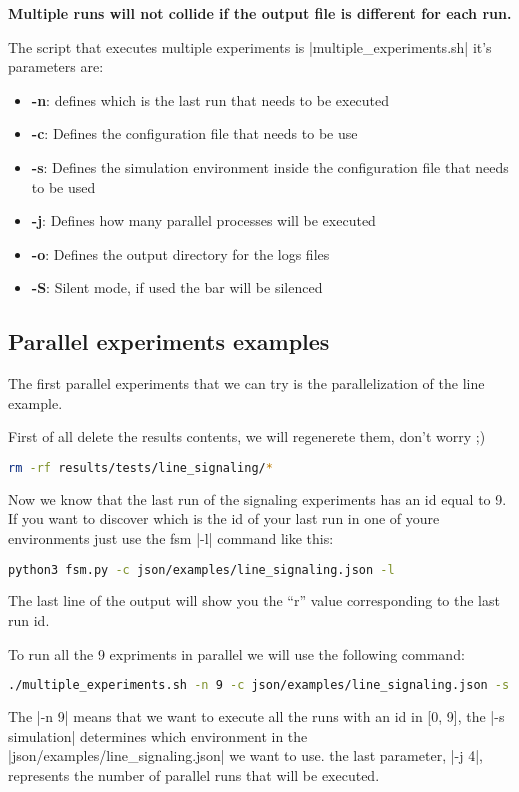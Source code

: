 \documentclass[10pt,journal,onecolumn]{IEEEtran}
\newcommand{\q}[1]{``#1''}
\begin{document}
\textbf{Multiple runs will not collide if the output file is different for
each run.}

The script that executes multiple experiments is |multiple_experiments.sh| it's 
parameters are:
\begin{itemize}
	\item \textbf{-n}: defines which is the last run that needs to be executed
	\item \textbf{-c}: Defines the configuration file that needs to be use
	\item \textbf{-s}: Defines the simulation environment inside the configuration
		file that needs to be used
	\item \textbf{-j}: Defines how many parallel processes will be executed
	\item \textbf{-o}: Defines the output directory for the logs files
	\item \textbf{-S}: Silent mode, if used the bar will be silenced
\end{itemize}

\subsection{Parallel experiments examples}
\label{subsec:parallel_examples}

The first parallel experiments that we can try is the parallelization of the
line example.

First of all delete the results contents, we will regenerete them, don't worry ;)
\begin{lstlisting}[language=bash]
rm -rf results/tests/line_signaling/*
\end{lstlisting}

Now we know that the last run of the signaling experiments has an id equal to \num{9}.
If you want to discover which is the id of your last run in one of youre environments
just use the fsm |-l| command like this:
\begin{lstlisting}[language=bash]
python3 fsm.py -c json/examples/line_signaling.json -l
\end{lstlisting}
The last line of the output will show you the \q{r} value corresponding to the last
run id.

To run all the \num{9} expriments in parallel we will use the following command:
\begin{lstlisting}[language=bash]
./multiple_experiments.sh -n 9 -c json/examples/line_signaling.json -s simulation -j 4
\end{lstlisting}
The |-n 9| means that we want to execute all the runs with an id in [0, 9], the
|-s simulation| determines which environment in the |json/examples/line_signaling.json|
we want to use. the last parameter, |-j 4|, represents the number of parallel 
runs that will be executed.
\end{document}
